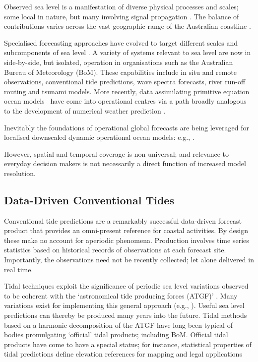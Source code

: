 Observed sea level is a manifestation of diverse physical processes and scales; some local in nature, but many involving signal propagation \cite{Melet:2016dd}.
The balance of contributions varies across the vast geographic range of the Australian coastline \cite{Haigh:2013bn,Haigh:2013he,Woodham:2013cl,Ridgway:2004kb,Church:1986tl,Allen:2009tf}.

Specialised forecasting approaches have evolved to target different scales and subcomponents of sea level \cite{Cartwright:2000tt,Petersen:2012kp}.
A variety of systems relevant to sea level are now in side-by-side, but isolated, operation in organisations such as the Australian Bureau of Meteorology (BoM). 
These capabilities include in situ and remote observations, conventional tide predictions, wave spectra forecasts, river run-off routing and tsunami models. 
More recently, data assimilating primitive equation ocean models~\cite{Schiller:2011di} have come into operational centres via a path broadly analogous to the development of numerical weather prediction \cite{Harper:kb}. 

Inevitably the foundations of operational global forecasts are being leveraged for localised downscaled dynamic operational ocean models: e.g., \cite{Paramygin:2017dx,Yang:2016ep,Wei:2014ex,Peng:2014kq}.

However, spatial and temporal coverage is non universal; and relevance to everyday decision makers is not necessarily a direct function of increased model resolution.  


\subsection{Data-Driven Conventional Tides}
\label{sec:tide_intro}

Conventional tide predictions are a remarkably successful data-driven forecast product that provides an omni-present reference for coastal activities.
By design these make no account for aperiodic phenomena. 
Production involves time series statistics based on historical records of observations at each forecast site.
Importantly, the observations need not be recently collected; let alone delivered in real time.

Tidal techniques exploit the significance of periodic sea level variations observed to be coherent with the `astronomical tide producing forces (ATGF)' \cite{Hendershott:1981ub}.     
Many variations exist for implementing this general approach (e.g., \cite{Foreman:2009bg,Groves:1975ky,LEFFLER:2009ej,Smith:1997ut} ). 
Useful sea level predictions can thereby be produced many years into the future.  
Tidal methods based on a harmonic decomposition of the ATGF have long been typical of bodies promulgating `official' tidal products; including BoM.
Official tidal products have come to have a special status; for instance, statistical properties of tidal predictions define elevation references for mapping and legal applications \cite{Mapping:2014wu}

